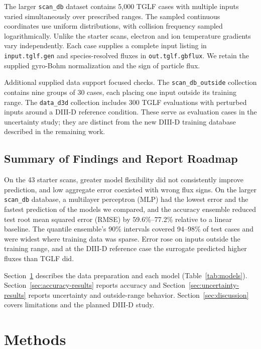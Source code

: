 \documentclass[12pt,letterpaper]{article}
\begin{document}
The larger \texttt{scan\_db} dataset contains 5,000 TGLF cases with multiple
inputs varied simultaneously over prescribed ranges. The sampled continuous
coordinates use uniform distributions, with collision
frequency sampled logarithmically. Unlike the starter scans, electron and ion
temperature gradients vary independently. Each case supplies a complete input
listing in \texttt{input.tglf.gen} and species-resolved fluxes in
\texttt{out.tglf.gbflux}. We retain the supplied gyro-Bohm normalization and
the sign of particle flux.

Additional supplied data support focused checks. The
\texttt{scan\_db\_outside} collection contains nine groups of 30 cases, each
placing one input outside its training range. The \texttt{data\_d3d}
collection includes 300 TGLF evaluations with perturbed inputs around a
DIII-D reference condition. These serve as evaluation cases in the uncertainty
study; they are distinct from the new DIII-D training database described in
the remaining work.

\subsection{Summary of Findings and Report Roadmap}

On the 43 starter scans, greater model flexibility did not consistently
improve prediction, and low aggregate error coexisted with wrong flux signs.
On the larger \texttt{scan\_db} database, a multilayer perceptron (MLP) had the lowest error and the
fastest prediction of the models we compared, and the accuracy ensemble
reduced test root mean squared error (RMSE) by 59.6\%--77.2\% relative to a linear
baseline. The quantile ensemble's 90\% intervals covered 94--98\% of test
cases and were widest where training data was sparse. Error rose on inputs
outside the training range, and at the DIII-D reference case the surrogate
predicted higher fluxes than TGLF did.

Section~\ref{sec:methods} describes the data preparation and each model
(Table~\ref{tab:models}). Section~\ref{sec:accuracy-results} reports accuracy
and Section~\ref{sec:uncertainty-results} reports uncertainty and
outside-range behavior. Section~\ref{sec:discussion} covers limitations and the
planned DIII-D study.

\section{Methods}
\label{sec:methods}
\end{document}

